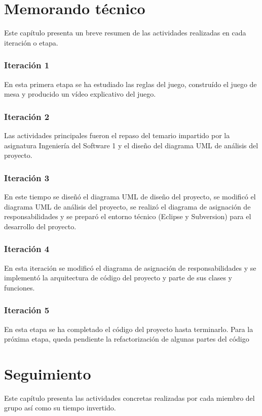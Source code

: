 \documentclass[11 pt]{book}
\begin{document}
\chapter{Memorando técnico}
	Este capítulo presenta un breve resumen de las actividades realizadas en cada iteración o etapa.
	
	\subsection*{Iteración 1}
		En esta primera etapa se ha estudiado las reglas del juego, construído el juego de mesa y producido un vídeo explicativo del juego.
		
	\subsection*{Iteración 2}
		Las actividades principales fueron el repaso del temario impartido por la asignatura Ingeniería del Software 1 y el diseño del diagrama UML de análisis del proyecto.
		
	\subsection*{Iteración 3}
		En este tiempo se diseñó el diagrama UML de diseño del proyecto, se modificó el diagrama UML de análisis del proyecto, se realizó el diagrama de asignación de responsabilidades y se preparó el entorno técnico (Eclipse y Subversion) para el desarrollo del proyecto.
		
	\subsection*{Iteración 4}
		En esta iteración se modificó el diagrama de asignación de responsabilidades y se implementó la arquitectura de código del proyecto y parte de sus clases y funciones.
	
	\subsection*{Iteración 5}
		En esta etapa se ha completado el código del proyecto hasta terminarlo. Para la próxima etapa, queda pendiente la refactorización de algunas partes del código
		
\chapter{Seguimiento}
	Este capítulo presenta las actividades concretas realizadas por cada miembro del grupo así como su tiempo invertido.
	
\end{document}

